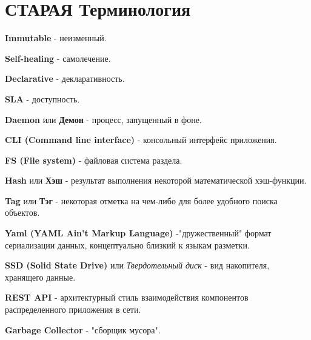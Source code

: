 \chapter{СТАРАЯ Терминология}
\label{cha:terms}

% 
% 
% 
% 
% 
% 
% 
% 
% 
% 
% 
%
%
\textbf{Immutable} - неизменный.

\textbf{Self-healing} - самолечение.

\textbf{Declarative} - декларативность.

\textbf{SLA} - доступность.

\textbf{Daemon} или \textbf{Демон} - процесс, запущенный в фоне.

\textbf{CLI (Command line interface)} - консольный интерфейс приложения.

\textbf{FS (File system)} - файловая система раздела.

\textbf{Hash} или \textbf{Хэш} - результат выполнения некоторой математической хэш-функции.

\textbf{Tag} или \textbf{Тэг} - некоторая отметка на чем-либо для более удобного поиска объектов.

\textbf{Yaml (YAML Ain't Markup Language)} -"дружественный" формат сериализации данных, концептуально близкий к языкам разметки.

\textbf{SSD (Solid State Drive)} или \textit{Твердотельный диск} - вид накопителя, хранящего данные.

\textbf{REST API} - архитектурный стиль взаимодействия компонентов распределенного приложения в сети.

\textbf{Garbage Collector} - "сборщик мусора".

